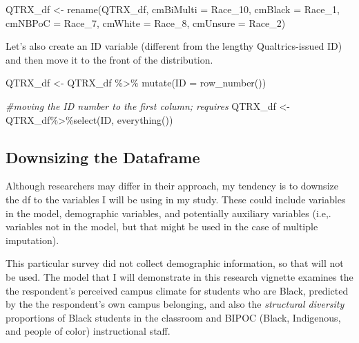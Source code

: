 \documentclass[
]{book}
\newenvironment{Shaded}{\begin{snugshade}}{\end{snugshade}}
\newcommand{\AttributeTok}[1]{\textcolor[rgb]{0.77,0.63,0.00}{#1}}
\newcommand{\CommentTok}[1]{\textcolor[rgb]{0.56,0.35,0.01}{\textit{#1}}}
\newcommand{\FunctionTok}[1]{\textcolor[rgb]{0.00,0.00,0.00}{#1}}
\newcommand{\NormalTok}[1]{#1}
\newcommand{\OtherTok}[1]{\textcolor[rgb]{0.56,0.35,0.01}{#1}}
\newcommand{\SpecialCharTok}[1]{\textcolor[rgb]{0.00,0.00,0.00}{#1}}
\begin{document}
\begin{Shaded}
\begin{Highlighting}[]
\NormalTok{QTRX\_df }\OtherTok{\textless{}{-}} \FunctionTok{rename}\NormalTok{(QTRX\_df, }\AttributeTok{cmBiMulti =}\NormalTok{ Race\_10, }\AttributeTok{cmBlack =}\NormalTok{ Race\_1, }\AttributeTok{cmNBPoC =}\NormalTok{ Race\_7, }\AttributeTok{cmWhite =}\NormalTok{ Race\_8, }\AttributeTok{cmUnsure =}\NormalTok{ Race\_2)}
\end{Highlighting}
\end{Shaded}

Let's also create an ID variable (different from the lengthy Qualtrics-issued ID) and then move it to the front of the distribution.

\begin{Shaded}
\begin{Highlighting}[]
\NormalTok{QTRX\_df }\OtherTok{\textless{}{-}}\NormalTok{ QTRX\_df }\SpecialCharTok{\%\textgreater{}\%} \FunctionTok{mutate}\NormalTok{(}\AttributeTok{ID =} \FunctionTok{row\_number}\NormalTok{())}

\CommentTok{\#moving the ID number to the first column; requires }
\NormalTok{QTRX\_df }\OtherTok{\textless{}{-}}\NormalTok{ QTRX\_df}\SpecialCharTok{\%\textgreater{}\%}\FunctionTok{select}\NormalTok{(ID, }\FunctionTok{everything}\NormalTok{())}
\end{Highlighting}
\end{Shaded}

\hypertarget{downsizing-the-dataframe}{%
\subsection{Downsizing the Dataframe}\label{downsizing-the-dataframe}}

Although researchers may differ in their approach, my tendency is to downsize the df to the variables I will be using in my study. These could include variables in the model, demographic variables, and potentially auxiliary variables (i.e,. variables not in the model, but that might be used in the case of multiple imputation).

This particular survey did not collect demographic information, so that will not be used. The model that I will demonstrate in this research vignette examines the the respondent's perceived campus climate for students who are Black, predicted by the the respondent's own campus belonging, and also the \emph{structural diversity} \citep{lewis_black_2019} proportions of Black students in the classroom and BIPOC (Black, Indigenous, and people of color) instructional staff.
\end{document}
